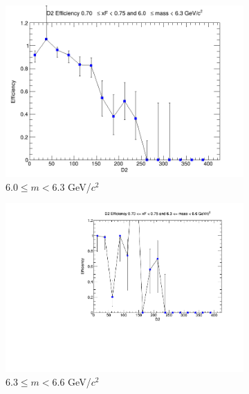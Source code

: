 \documentclass[11pt]{article}
\begin{document}
\begin{figure}[p]
\begin{subfigure}[b]{0.32\textwidth}
        \includegraphics[width=\textwidth]{./kTrackerEfficiencyPlots/D2_Efficiency_xF14_mass6.png}
        \caption{$6.0 \leq m < 6.3$ GeV/$c^2$}
    \end{subfigure}\hfill
    \begin{subfigure}[b]{0.32\textwidth}
        \centering
        \includegraphics[width=\textwidth]{./kTrackerEfficiencyPlots/D2_Efficiency_xF14_mass7.pdf}
        \caption{$6.3 \leq m < 6.6$ GeV/$c^2$}
    \end{subfigure}\hfill
    \begin{subfigure}[b]{0.32\textwidth}
        \centering

\end{subfigure}
\end{figure}
\end{document}
